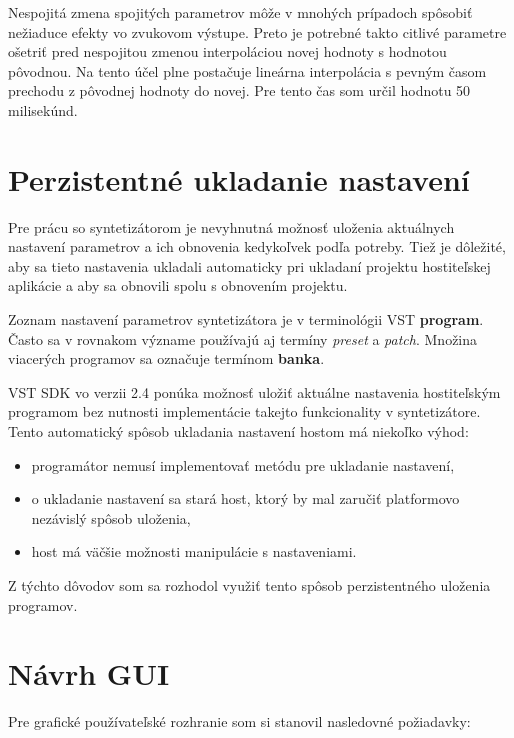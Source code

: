 Nespojitá zmena spojitých parametrov môže v mnohých prípadoch spôsobiť nežiaduce efekty vo zvukovom výstupe. Preto je potrebné takto citlivé parametre ošetriť pred nespojitou zmenou interpoláciou novej hodnoty s hodnotou pôvodnou. Na tento účel plne postačuje lineárna interpolácia s pevným časom prechodu z pôvodnej hodnoty do novej. Pre tento čas som určil hodnotu 50 milisekúnd.

\section{Perzistentné ukladanie nastavení}

Pre prácu so syntetizátorom je nevyhnutná možnosť uloženia aktuálnych nastavení parametrov a ich obnovenia kedykoľvek podľa potreby. Tiež je dôležité, aby sa tieto nastavenia ukladali automaticky pri ukladaní projektu hostiteľskej aplikácie a aby sa obnovili spolu s obnovením projektu. 

Zoznam nastavení parametrov syntetizátora je v terminológii VST \textbf{program}. Často sa v rovnakom význame používajú aj termíny \emph{preset} a \emph{patch}. Množina viacerých programov sa označuje termínom \textbf{banka}.

VST SDK vo verzii 2.4 ponúka možnosť uložiť aktuálne nastavenia hostiteľským programom bez nutnosti implementácie takejto funkcionality v syntetizátore. Tento automatický spôsob ukladania nastavení hostom má niekoľko výhod:

\begin{itemize}
\setlength{\itemsep}{-0.5ex}
\item programátor nemusí implementovať metódu pre ukladanie nastavení,
\item o ukladanie nastavení sa stará host, ktorý by mal zaručiť platformovo nezávislý spôsob uloženia,
\item host má väčšie možnosti manipulácie s nastaveniami.
\end{itemize}

Z týchto dôvodov som sa rozhodol využiť tento spôsob perzistentného uloženia programov.

\section{Návrh GUI}

Pre grafické používateľské rozhranie som si stanovil nasledovné požiadavky:

